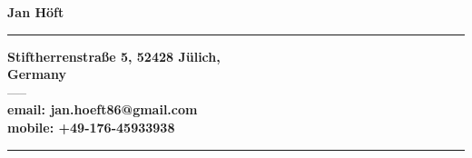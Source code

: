 \documentclass[phd]{UWMThesis}
\renewcommand{\.}{\textrm{ .}}
\theoremstyle{definition}
\numberwithin{thm}{chapter}
\begin{document}
	\begin{ThesisCV} %
		
		{\centering \large \textbf{Jan H\"oft}\\}
		\vspace{0.5cm}
		\hrule
		\begin{center}
				\textbf{Stiftherrenstra\ss e 5, 52428 J\"ulich,}\\ 
				\textbf{Germany}\\
				\vspace{0.1cm}
				-----\\
				\vspace{0.1cm}
				\textbf{email: jan.hoeft86@gmail.com}\\
				\textbf{mobile: +49-176-45933938}
		\end{center}
		\hrule
		\vspace{1cm}


\end{ThesisCV}
\end{document}
